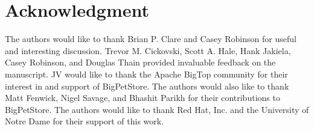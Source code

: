 \documentclass[conference]{IEEEtran}
\begin{document}






\section*{Acknowledgment}
The authors would like to thank Brian P. Clare and Casey Robinson for useful and interesting discussion.  Trevor M. Cickovski, Scott A. Hale, Hank Jakiela, Casey Robinson, and Douglas Thain provided invaluable feedback on the manuscript.  JV would like to thank the Apache BigTop community for their interest in and support of BigPetStore.  The authors would also like to thank Matt Fenwick, Nigel Savage, and Bhashit Parikh for their contributions to BigPetStore. The authors would like to thank Red Hat, Inc. and the University of Notre Dame for their support of this work.









%
%








\end{document}
